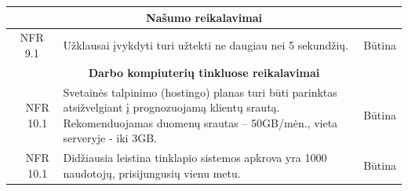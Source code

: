 \documentclass{VUMIFPSkursinis}
\begin{document}
\begin{table}[H]
\begin{tabular}{|p{1cm}|p{1cm}|p{}|p{}|}
\hline
\multicolumn{4}{|c|}{\bfseries Našumo reikalavimai}\\		
		
	\hline
		\multicolumn{2}{|c|}{NFR 9.1}&
		{Užklausai įvykdyti turi užtekti ne daugiau nei 5 sekundžių.
		}&
		\multicolumn{1}{c|}{Būtina}\\
		
	\hline
\multicolumn{4}{|c|}{\bfseries Darbo kompiuterių tinkluose reikalavimai}\\		
			
	\hline
		\multicolumn{1}{|c}{}&
		\multicolumn{1}{c|}{NFR 10.1}&
		{Svetainės talpinimo (hostingo) planas turi būti parinktas atsižvelgiant į prognozuojamą klientų srautą. Rekomenduojamas duomenų srautas – 50GB/mėn., vieta serveryje - iki 3GB.
		}&
		\multicolumn{1}{c|}{Būtina}\\
		
		\hline
		\multicolumn{1}{|c}{}&
		\multicolumn{1}{c|}{NFR 10.1}&
		{Didžiausia leistina tinklapio sistemos apkrova yra 1000 naudotojų, prisijungusių vienu metu.
		}&
		\multicolumn{1}{c|}{Būtina}\\
	\hline
	\end{tabular}		
	\end{table}
\end{document}
